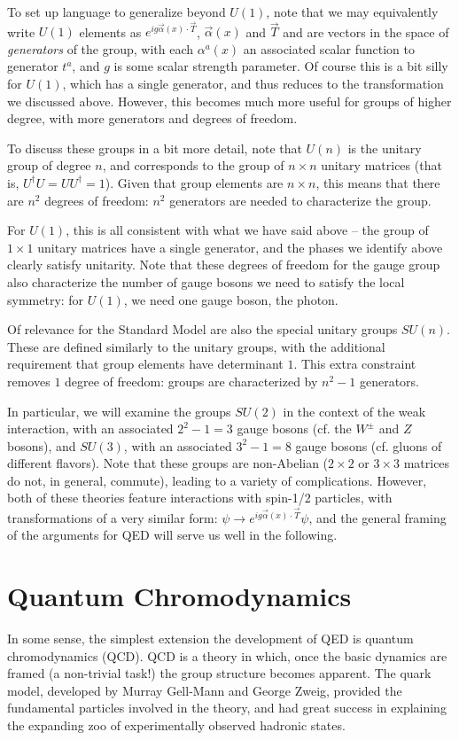 To set up language to generalize beyond $U(1)$, note that we may equivalently write $U(1)$ elements as
$e^{ig\vec{\alpha}(x)\cdot \vec{T}}$, $\vec{\alpha}(x)$ and $\vec{T}$ and are vectors in the space of 
\emph{generators} of the group, with each $\alpha^{a}(x)$ an associated scalar function to generator $t^{a}$, 
and $g$ is some scalar strength parameter. Of course this is a bit silly for $U(1)$, which has a single generator, 
and thus reduces to the transformation we discussed above. However, this becomes much more useful for groups of higher 
degree, with more generators and degrees of freedom.

To discuss these groups in a bit more detail, note that $U(n)$ is the unitary group of 
degree $n$, and corresponds to the group of $n \times n$ unitary matrices (that is, $U^{\dagger}U = UU^{\dagger} = 1$).
Given that group elements are $n\times n$, this means that there are $n^2$ degrees of freedom:
$n^2$ generators are needed to characterize the group.

For $U(1)$, this is all consistent with what we have said above -- the group of $1 \times 1$ unitary matrices 
have a single generator, and the phases we identify above clearly satisfy unitarity. Note that these degrees 
of freedom for the gauge group also characterize the number of gauge bosons we need to satisfy the local symmetry: 
for $U(1)$, we need one gauge boson, the photon.

Of relevance for the Standard Model are also the special unitary groups $SU(n)$. These are defined similarly 
to the unitary groups, with the additional requirement that group elements have determinant $1$. This extra 
constraint removes $1$ degree of freedom: groups are characterized by $n^2-1$ generators.

In particular, we will examine the groups $SU(2)$ in the context of the weak interaction, with an associated
$2^2-1=3$ gauge bosons (cf. the $W^{\pm}$ and $Z$ bosons), and $SU(3)$, with an associated $3^2-1 = 8$ gauge bosons 
(cf. gluons of different flavors). Note that these groups are non-Abelian ($2\times 2$ or $3\times 3$ matrices do not, 
in general, commute), leading to a variety of complications. However, both of these theories feature interactions with 
spin-1/2 particles, with transformations of a very similar form: $\psi \rightarrow e^{ig\vec{\alpha}(x)\cdot \vec{T}}\psi$, 
and the general framing of the arguments for QED will serve us well in the following.


\section{Quantum Chromodynamics}
In some sense, the simplest extension the development of QED is quantum chromodynamics (QCD). QCD is a 
theory in which, once the basic dynamics are framed (a non-trivial task!) the group structure becomes 
apparent. The quark model, developed by Murray Gell-Mann and George Zweig, provided the 
fundamental particles involved in the theory, and had great success in explaining the expanding zoo 
of experimentally observed hadronic states.

